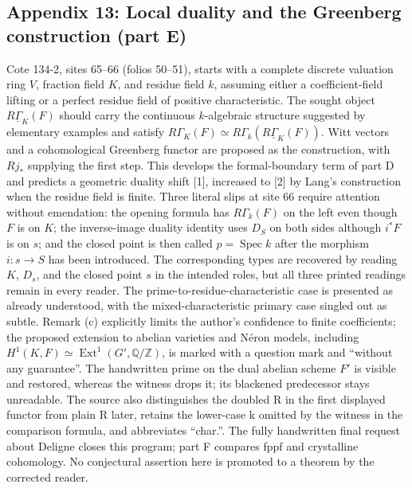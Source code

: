 \documentclass[10pt,oneside]{book}
\begin{document}
\subsection*{Appendix 13: Local duality and the Greenberg construction (part E)}
Cote 134-2, sites 65--66 (folios 50--51), starts with a complete discrete valuation ring $V$, fraction field $K$, and residue field $k$, assuming either a coefficient-field lifting or a perfect residue field of positive characteristic. The sought object $R\underline\Gamma_K(F)$ should carry the continuous $k$-algebraic structure suggested by elementary examples and satisfy $R\Gamma_K(F)\simeq R\Gamma_k(R\underline\Gamma_K(F))$. Witt vectors and a cohomological Greenberg functor are proposed as the construction, with $Rj_*$ supplying the first step. This develops the formal-boundary term of part D and predicts a geometric duality shift [1], increased to [2] by Lang's construction when the residue field is finite. Three literal slips at site 66 require attention without emendation: the opening formula has $R\Gamma_k(F)$ on the left even though $F$ is on $K$; the inverse-image duality identity uses $D_S$ on both sides although $i^*F$ is on $s$; and the closed point is then called $p=\operatorname{Spec}k$ after the morphism $i:s\to S$ has been introduced. The corresponding types are recovered by reading $K$, $D_s$, and the closed point $s$ in the intended roles, but all three printed readings remain in every reader. The prime-to-residue-characteristic case is presented as already understood, with the mixed-characteristic primary case singled out as subtle. Remark (c) explicitly limits the author's confidence to finite coefficients; the proposed extension to abelian varieties and Néron models, including $H^1(K,F)\simeq\operatorname{Ext}^1(G',\mathbb Q/\mathbb Z)$, is marked with a question mark and ``without any guarantee''. The handwritten prime on the dual abelian scheme $F'$ is visible and restored, whereas the witness drops it; its blackened predecessor stays unreadable. The source also distinguishes the doubled R in the first displayed functor from plain R later, retains the lower-case k omitted by the witness in the comparison formula, and abbreviates ``char.''. The fully handwritten final request about Deligne closes this program; part F compares fppf and crystalline cohomology. No conjectural assertion here is promoted to a theorem by the corrected reader.
\end{document}
